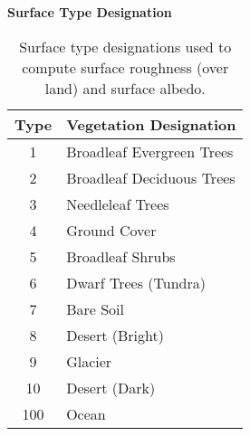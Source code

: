 \begin{table}
\begin{center}
{\bf Surface Type Designation} \\
\vspace{0.1in}
\begin{tabular}{ |c|l| }
\hline
Type & Vegetation Designation \\ \hline
\hline
  1 & Broadleaf Evergreen Trees \\ \hline
  2 & Broadleaf Deciduous Trees \\ \hline
  3 & Needleleaf Trees \\ \hline
  4 & Ground Cover \\ \hline   
  5 & Broadleaf Shrubs \\ \hline
  6 & Dwarf Trees (Tundra) \\ \hline
  7 & Bare Soil \\ \hline
  8 & Desert (Bright) \\ \hline
  9 & Glacier \\ \hline
 10 & Desert (Dark) \\ \hline
100 & Ocean \\ \hline
\end{tabular}
\end{center}
\caption{Surface type designations used to compute surface roughness (over land) 
and surface albedo.}
\label{tab:fizhi:surftype}
\end{table}
 
 
\begin{figure*}[htbp]
  \begin{center}
  \end{center}
  \vspace{0.2in}
  \caption  {Surface Type Combinations at $1^\circ$ resolution.}
  \label{fig:fizhi:surftype}
\end{figure*}



